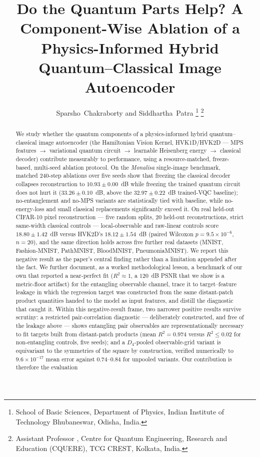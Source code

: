 \documentclass[journal]{IEEEtran}
\begin{document}
\title{Do the Quantum Parts Help? A Component-Wise Ablation of a Physics-Informed Hybrid Quantum--Classical Image Autoencoder}

\author{Sparsho~Chakraborty and Siddhartha~Patra%
\thanks{School of Basic Sciences, Department of Physics, Indian Institute of Technology Bhubaneswar, Odisha, India.}%
\thanks{ Assistant Professor , Centre for Quantum Engineering, Research and Education (CQUERE), TCG CREST, Kolkata, India.}}

\maketitle

\begin{abstract}
We study whether the quantum components of a physics-informed hybrid quantum--classical image autoencoder (the Hamiltonian Vision Kernel, HVK1D/HVK2D --- MPS features $\to$ variational quantum circuit $\to$ learnable Heisenberg energy $\to$ classical decoder) contribute measurably to performance, using a resource-matched, freeze-based, multi-seed ablation protocol. On the \textit{Monalisa} single-image benchmark, matched 240-step ablations over five seeds show that freezing the classical decoder collapses reconstruction to $10.93\pm0.00$~dB while freezing the trained quantum circuit does not hurt it ($33.26\pm0.10$~dB, above the $32.97\pm0.22$~dB trained-VQC baseline); no-entanglement and no-MPS variants are statistically tied with baseline, while no-energy-loss and small classical replacements significantly exceed it. On real held-out CIFAR-10 pixel reconstruction --- five random splits, 20 held-out reconstructions, strict same-width classical controls --- local-observable and raw-linear controls score $18.80\pm1.42$~dB versus HVK2D's $18.12\pm1.54$~dB (paired Wilcoxon $p=9.5\times10^{-6}$, $n=20$), and the same direction holds across five further real datasets (MNIST, Fashion-MNIST, PathMNIST, BloodMNIST, PneumoniaMNIST). We report this negative result as the paper's central finding rather than a limitation appended after the fact. We further document, as a worked methodological lesson, a benchmark of our own that reported a near-perfect fit ($R^2\approx1$, a $120$~dB PSNR that we show is a metric-floor artifact) for the entangling observable channel, trace it to target--feature leakage in which the regression target was constructed from the same distant-patch product quantities handed to the model as input features, and distill the diagnostic that caught it. Within this negative-result frame, two narrower positive results survive scrutiny: a restricted pair-correlation diagnostic --- deliberately constructed, and free of the leakage above --- shows entangling pair observables are representationally necessary to fit targets built from distant-patch products (mean $R^2=0.974$ versus $R^2\leq0.02$ for non-entangling controls, five seeds); and a $D_4$-pooled observable-grid variant is equivariant to the symmetries of the square by construction, verified numerically to $9.6\times10^{-17}$ mean error against $0.74$--$0.84$ for unpooled variants. Our contribution is therefore the evaluation 
\end{abstract}
\end{document}
